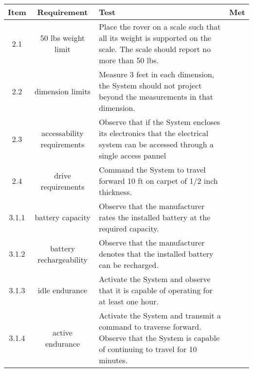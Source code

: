 \documentclass[12pt]{article}
\begin{document}
\begin{tabular}{|c|c|p{8cm}|c|}
  \hline
  Item & Requirement & Test & Met\\\hline
  2.1 & 50 lbs weight limit & Place the rover on a scale such that all its weight is supported on the scale.  The scale should report no more than 50 lbs. & \\\hline
  2.2 & dimension limits & Measure 3 feet in each dimension, the System should not project beyond the measurements in that dimension. & \\\hline
  2.3 & accessability requirements & Observe that if the System encloses its electronics that the electrical system can be accessed through a single access pannel & \\\hline
  2.4 & drive requirements & Command the System to travel forward 10 ft on carpet of 1/2 inch thickness. & \\\hline
  3.1.1 & battery capacity & Observe that the manufacturer rates the installed battery at the required capacity. & \\\hline
  3.1.2 & battery rechargeability & Observe that the manufacturer denotes that the installed battery can be recharged. & \\\hline
  3.1.3 & idle endurance & Activate the System and observe that it is capable of operating for at least one hour. & \\\hline
  3.1.4 & active endurance & Activate the System and transmit a command to traverse forward.  Observe that the System is capable of continuing to travel for 10 minutes. & \\\hline

\end{tabular}
\end{document}
